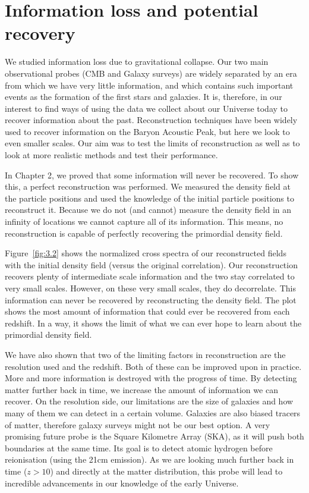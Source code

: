 
\section{Information loss and potential recovery}

We studied information loss due to gravitational collapse. Our two main observational probes (CMB and Galaxy surveys) are widely separated by an era from which we have very little information, and which contains such important events as the formation of the first stars and galaxies. It is, therefore, in our interest to find ways of using the data we collect about our Universe today to recover information about the past. Reconstruction techniques have been widely used to recover information on the Baryon Acoustic Peak, but here we look to even smaller scales. Our aim was to test the limits of reconstruction as well as to look at more realistic methods and test their performance.

In Chapter 2, we proved that some information will never be recovered. To show this, a perfect reconstruction was performed. We measured the density field at the particle positions and used the knowledge of the initial particle positions to reconstruct it. Because we do not (and cannot) measure the density field in an infinity of locations we cannot capture all of its information. This means, no reconstruction is capable of perfectly recovering the primordial density field.

Figure~\ref{fig:3.2} shows the normalized cross spectra of our reconstructed fields with the initial density field (versus the original correlation). Our reconstruction recovers plenty of  intermediate scale information and the two stay correlated to very small scales. However, on these very small scales, they do decorrelate. This information can never be recovered by reconstructing the density field. The plot shows the most amount of information that could ever be recovered from each redshift. In a way, it shows the limit of what we can ever hope to learn about the primordial density field. 

We have also shown that two of the limiting factors in reconstruction are the resolution used and the redshift. Both of these can be improved upon in practice. More and more information is destroyed with the progress of time. By detecting matter further back in time, we increase the amount of information we can recover. On the resolution side, our limitations are the size of galaxies and how many of them we can detect in a certain volume. Galaxies are also biased tracers of matter, therefore galaxy surveys might not be our best option. A very promising future probe is the Square Kilometre Array (SKA), as it will push both boundaries at the same time. Its goal is to detect atomic hydrogen before reionisation (using the 21cm emission). As we are looking much further back in time ($z>10$) and directly at the matter distribution, this probe will lead to incredible advancements in our knowledge of the early Universe.


